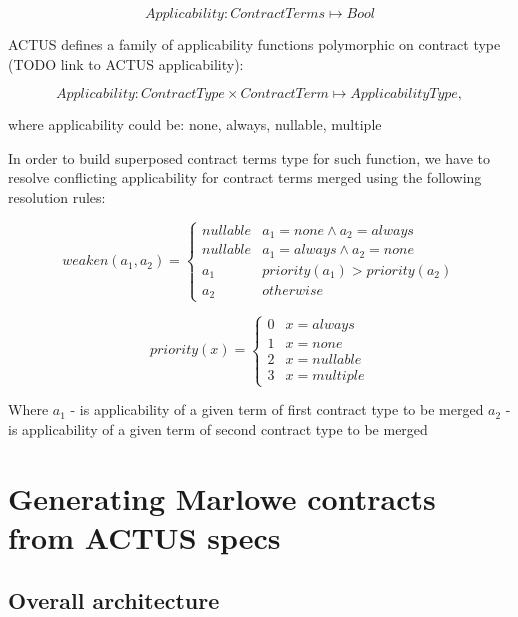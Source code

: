 \documentclass[runningheads]{llncs}
\begin{document}
\noindent 
\begin{equation}
Applicability:ContractTerms\mapsto Bool
\end{equation}

ACTUS defines a family of applicability functions polymorphic on contract
type (TODO link to ACTUS applicability):

\noindent 
\begin{equation}
Applicability:ContractType\times ContractTerm\mapsto ApplicabilityType,
\end{equation}

where applicability could be: none, always, nullable, multiple

In order to build superposed contract terms type for such function,
we have to resolve conflicting applicability for contract terms merged
using the following resolution rules:

\noindent 
\begin{equation}
weaken(a_{1},a_{2})=\begin{cases}
nullable & a_{1}=none\wedge a_{2}=always\\
nullable & a_{1}=always\wedge a_{2}=none\\
a_{1} & priority(a_{1})>priority(a_{2})\\
a_{2} & otherwise
\end{cases}
\end{equation}

\noindent 
\begin{equation}
priority(x)=\begin{cases}
0 & x=always\\
1 & x=none\\
2 & x=nullable\\
3 & x=multiple
\end{cases}
\end{equation}

Where $a_{1}$ - is applicability of a given term of first contract
type to be merged $a_{2}$ - is applicability of a given term of second
contract type to be merged

\section{Generating Marlowe contracts from ACTUS specs}%
\label{generation}

\subsection{Overall architecture }
\end{document}
